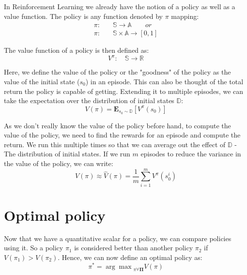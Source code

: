 \documentclass[BTech]{iitmdiss}
\begin{document}
In Reinforcement Learning we already have the notion of a policy as well as a value function. The policy is any function denoted by $\pi$ mapping:
\begin{equation} \begin{split}
  \pi :& \quad \mathbb{S} \rightarrow \mathbb{A} \qquad or \\
  \pi :& \quad \mathbb{S} \times \mathbb{A} \rightarrow [0,1]
\end{split} \end{equation}

The value function of a policy is then defined as:
\begin{equation}
  V^{\pi} : \quad \mathbb{S} \rightarrow \mathbb{R}
\end{equation}

Here, we define the value of the policy or the "goodness" of the policy as the value of the initial state ($s_{0}$) in an episode. This can also be thought of the total return the policy is capable of getting. Extending it to multiple episodes, we can take the expectation over the distribution of initial states $\mathbb{D}$:
\begin{equation}
  V(\pi) = \mathbf{E}_{s_{0} \sim \mathbb{D}} [ V^{\pi} (s_{0})]
\end{equation}

As we don't really know the value of the policy before hand, to compute the value of the policy, we need to find the rewards for an episode and compute the return. We run this multiple times so that we can average out the effect of $\mathbb{D}$ - The distribution of initial states. If we run $m$ episodes to reduce the variance in the value of the policy, we can write:
\begin{equation}
  V(\pi) \approx \hat{V}(\pi) = \frac{1}{m} \sum_{i=1}^{m} V^{\pi} (s_{0}^{i})
\end{equation}

\section{Optimal policy}

Now that we have a quantitative scalar for a policy, we can compare policies using it. So a policy $\pi_{1}$ is considered better than another policy $\pi_{2}$ if $V(\pi_{1}) > V(\pi_{2})$. Hence, we can now define an optimal policy as:
\begin{equation}
  \pi^{*} = {\arg \max}_{\pi \forall \mathbf{\Pi}} {V(\pi)}
\end{equation}
\end{document}

